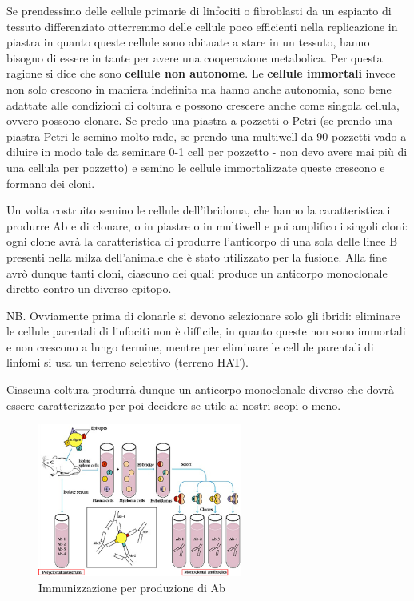 \documentclass[11pt]{book}
\begin{document}
Se prendessimo delle cellule primarie di linfociti o fibroblasti da un espianto di tessuto differenziato otterremmo delle cellule poco efficienti nella replicazione in piastra in quanto queste cellule sono abituate a stare in un tessuto, hanno bisogno di essere in tante per avere una cooperazione metabolica. Per questa ragione si dice che sono \textbf{cellule non autonome}.
Le \textbf{cellule immortali} invece non solo crescono in maniera indefinita ma hanno anche autonomia, sono bene adattate alle condizioni di coltura e possono crescere anche come singola cellula, ovvero possono clonare.
Se predo una piastra a pozzetti o Petri (se prendo una piastra Petri le semino molto rade, se prendo una multiwell da 90 pozzetti vado a diluire in modo tale da seminare 0-1 cell per pozzetto - non devo avere mai più di una cellula per pozzetto) e semino le cellule immortalizzate queste crescono e formano dei cloni.

Un volta costruito semino le cellule dell’ibridoma, che hanno la caratteristica i produrre Ab e di clonare, o in piastre o in multiwell e poi amplifico i singoli cloni: ogni clone avrà la caratteristica di produrre l’anticorpo di una sola delle linee B presenti nella milza dell’animale che è stato utilizzato per la fusione. Alla fine avrò dunque tanti cloni, ciascuno dei quali produce un anticorpo monoclonale diretto contro un diverso epitopo.

NB. Ovviamente prima di clonarle si devono selezionare solo gli ibridi: eliminare le cellule parentali di linfociti non è difficile, in quanto queste non sono immortali e non crescono a lungo termine, mentre per eliminare le cellule parentali di linfomi si usa un terreno selettivo (terreno HAT).

Ciascuna coltura produrrà dunque un anticorpo monoclonale diverso che dovrà essere caratterizzato per poi decidere se utile ai nostri scopi o meno.

\begin{figure}
    \includegraphics[width=0.60\textwidth]{img/27_ibridi_anticorpi.png}
  \caption{Immunizzazione per produzione di Ab}
\end{figure}
\end{document}
